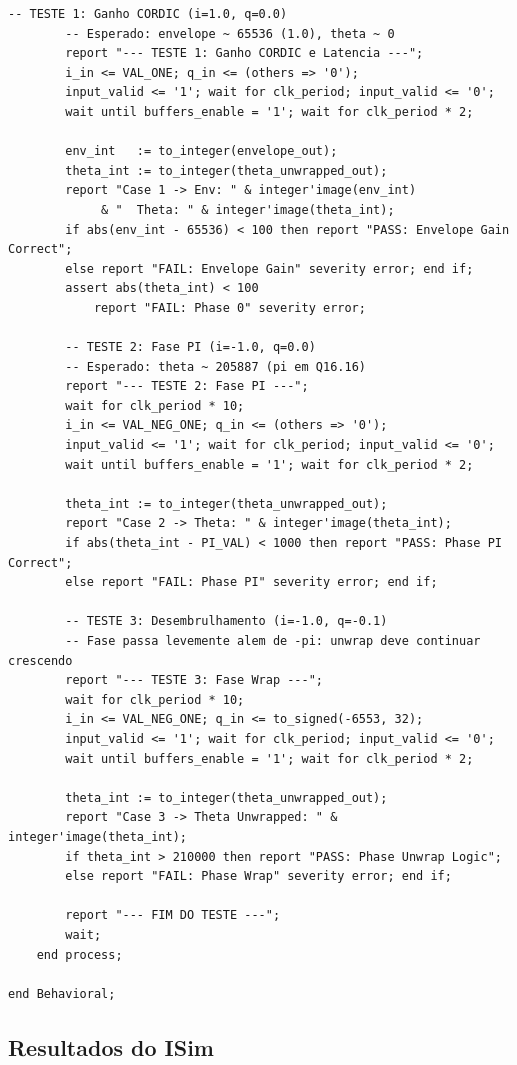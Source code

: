 \documentclass[a4paper,12pt]{article}
\begin{document}
\begin{lstlisting}[style=vhdlstyle,
    caption={Testbench do \texttt{Input\_Processing\_Block}.},
    label={lst:tb}]
        -- TESTE 1: Ganho CORDIC (i=1.0, q=0.0)
        -- Esperado: envelope ~ 65536 (1.0), theta ~ 0
        report "--- TESTE 1: Ganho CORDIC e Latencia ---";
        i_in <= VAL_ONE; q_in <= (others => '0');
        input_valid <= '1'; wait for clk_period; input_valid <= '0';
        wait until buffers_enable = '1'; wait for clk_period * 2;

        env_int   := to_integer(envelope_out);
        theta_int := to_integer(theta_unwrapped_out);
        report "Case 1 -> Env: " & integer'image(env_int)
             & "  Theta: " & integer'image(theta_int);
        if abs(env_int - 65536) < 100 then report "PASS: Envelope Gain Correct";
        else report "FAIL: Envelope Gain" severity error; end if;
        assert abs(theta_int) < 100
            report "FAIL: Phase 0" severity error;

        -- TESTE 2: Fase PI (i=-1.0, q=0.0)
        -- Esperado: theta ~ 205887 (pi em Q16.16)
        report "--- TESTE 2: Fase PI ---";
        wait for clk_period * 10;
        i_in <= VAL_NEG_ONE; q_in <= (others => '0');
        input_valid <= '1'; wait for clk_period; input_valid <= '0';
        wait until buffers_enable = '1'; wait for clk_period * 2;

        theta_int := to_integer(theta_unwrapped_out);
        report "Case 2 -> Theta: " & integer'image(theta_int);
        if abs(theta_int - PI_VAL) < 1000 then report "PASS: Phase PI Correct";
        else report "FAIL: Phase PI" severity error; end if;

        -- TESTE 3: Desembrulhamento (i=-1.0, q=-0.1)
        -- Fase passa levemente alem de -pi: unwrap deve continuar crescendo
        report "--- TESTE 3: Fase Wrap ---";
        wait for clk_period * 10;
        i_in <= VAL_NEG_ONE; q_in <= to_signed(-6553, 32);
        input_valid <= '1'; wait for clk_period; input_valid <= '0';
        wait until buffers_enable = '1'; wait for clk_period * 2;

        theta_int := to_integer(theta_unwrapped_out);
        report "Case 3 -> Theta Unwrapped: " & integer'image(theta_int);
        if theta_int > 210000 then report "PASS: Phase Unwrap Logic";
        else report "FAIL: Phase Wrap" severity error; end if;

        report "--- FIM DO TESTE ---";
        wait;
    end process;

end Behavioral;
\end{lstlisting}

\subsection{Resultados do ISim}
\end{document}
